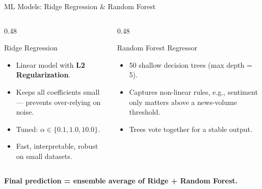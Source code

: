 \documentclass[aspectratio=169, 10pt]{beamer}
\begin{document}
\begin{frame}{ML Models: Ridge Regression \& Random Forest}
    \begin{columns}[T]
        \begin{column}{0.48\textwidth}
            \begin{block}{Ridge Regression}
                \begin{itemize}
                    \item Linear model with \textbf{L2 Regularization}.
                    \item Keeps all coefficients small — prevents over-relying on noise.
                    \item Tuned: $\alpha \in \{0.1, 1.0, 10.0\}$.
                    \item Fast, interpretable, robust on small datasets.
                \end{itemize}
            \end{block}
        \end{column}
        \begin{column}{0.48\textwidth}
            \begin{block}{Random Forest Regressor}
                \begin{itemize}
                    \item 50 shallow decision trees (max depth = 5).
                    \item Captures non-linear rules, e.g., sentiment only matters above a news-volume threshold.
                    \item Trees vote together for a stable output.
                \end{itemize}
            \end{block}
        \end{column}
    \end{columns}
    \vspace{0.4em}
    \centering \small \textbf{Final prediction = ensemble average of Ridge + Random Forest.}
\end{frame}
\end{document}
